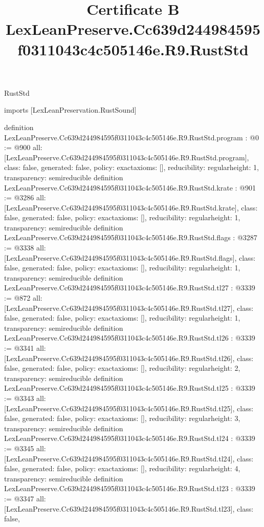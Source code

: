 \begin{lexlean}{RustStd}
\title{Certificate B LexLeanPreserve.Cc639d244984595f0311043c4c505146e.R9.RustStd}
\begin{coremodule}
imports [LexLeanPreservation.RustSound]

definition LexLeanPreserve.Cc639d244984595f0311043c4c505146e.R9.RustStd.program : @0 := @900 {
  all: [LexLeanPreserve.Cc639d244984595f0311043c4c505146e.R9.RustStd.program],
  class: false,
  generated: false,
  policy: exact{axioms: []},
  reducibility: regular{height: 1},
  transparency: semireducible
}
definition LexLeanPreserve.Cc639d244984595f0311043c4c505146e.R9.RustStd.krate : @901 := @3286 {
  all: [LexLeanPreserve.Cc639d244984595f0311043c4c505146e.R9.RustStd.krate],
  class: false,
  generated: false,
  policy: exact{axioms: []},
  reducibility: regular{height: 1},
  transparency: semireducible
}
definition LexLeanPreserve.Cc639d244984595f0311043c4c505146e.R9.RustStd.flags : @3287 := @3338 {
  all: [LexLeanPreserve.Cc639d244984595f0311043c4c505146e.R9.RustStd.flags],
  class: false,
  generated: false,
  policy: exact{axioms: []},
  reducibility: regular{height: 1},
  transparency: semireducible
}
definition LexLeanPreserve.Cc639d244984595f0311043c4c505146e.R9.RustStd.tl27 : @3339 := @872 {
  all: [LexLeanPreserve.Cc639d244984595f0311043c4c505146e.R9.RustStd.tl27],
  class: false,
  generated: false,
  policy: exact{axioms: []},
  reducibility: regular{height: 1},
  transparency: semireducible
}
definition LexLeanPreserve.Cc639d244984595f0311043c4c505146e.R9.RustStd.tl26 : @3339 := @3341 {
  all: [LexLeanPreserve.Cc639d244984595f0311043c4c505146e.R9.RustStd.tl26],
  class: false,
  generated: false,
  policy: exact{axioms: []},
  reducibility: regular{height: 2},
  transparency: semireducible
}
definition LexLeanPreserve.Cc639d244984595f0311043c4c505146e.R9.RustStd.tl25 : @3339 := @3343 {
  all: [LexLeanPreserve.Cc639d244984595f0311043c4c505146e.R9.RustStd.tl25],
  class: false,
  generated: false,
  policy: exact{axioms: []},
  reducibility: regular{height: 3},
  transparency: semireducible
}
definition LexLeanPreserve.Cc639d244984595f0311043c4c505146e.R9.RustStd.tl24 : @3339 := @3345 {
  all: [LexLeanPreserve.Cc639d244984595f0311043c4c505146e.R9.RustStd.tl24],
  class: false,
  generated: false,
  policy: exact{axioms: []},
  reducibility: regular{height: 4},
  transparency: semireducible
}
definition LexLeanPreserve.Cc639d244984595f0311043c4c505146e.R9.RustStd.tl23 : @3339 := @3347 {
  all: [LexLeanPreserve.Cc639d244984595f0311043c4c505146e.R9.RustStd.tl23],
  class: false,
}
\end{coremodule}
\end{lexlean}

